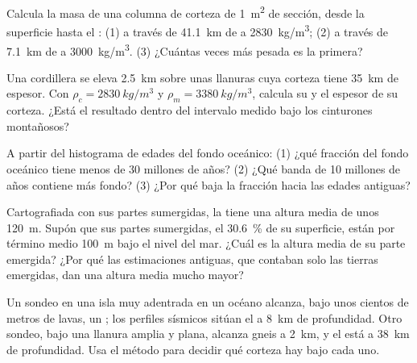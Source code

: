 \begin{exercise}[$\star\star$]\label{exo:g12:continental-crust:7}
Calcula la masa de una columna de corteza de \qty{1}{m^2} de sección, desde
la superficie hasta el : (1) a través de \qty{41.1}{km} de  a \qty{2830}{kg/m^3}; (2) a través de \qty{7.1}{km} de  a \qty{3000}{kg/m^3}. (3) ¿Cuántas veces más pesada es la primera?
\end{exercise}

\begin{exercise}[$\star\star$]\label{exo:g12:continental-crust:8}
Una cordillera se eleva \qty{2.5}{km} sobre unas llanuras cuya corteza tiene
\qty{35}{km} de espesor. Con $\rho_c = \qty{2830}{kg/m^3}$ y $\rho_m =
\qty{3380}{kg/m^3}$, calcula su  y el espesor de su corteza. ¿Está el
resultado dentro del intervalo medido bajo los cinturones montañosos?
\end{exercise}

\begin{exercise}[$\star\star$]\label{exo:g12:continental-crust:9}
A partir del histograma de edades del fondo oceánico: (1) ¿qué fracción del
fondo oceánico tiene menos de 30 millones de años? (2) ¿Qué banda de 10
millones de años contiene más fondo? (3) ¿Por qué baja la fracción hacia las
edades antiguas?
\end{exercise}

\begin{exercise}[$\star\star$]\label{exo:g12:continental-crust:10}
Cartografiada con sus partes sumergidas, la  tiene una
altura media de unos \qty{120}{m}. Supón que sus partes sumergidas, el
\qty{30.6}{\percent} de su superficie, están por término medio \qty{100}{m}
bajo el nivel del mar. ¿Cuál es la altura media de su parte emergida? ¿Por qué
las estimaciones antiguas, que contaban solo las tierras emergidas, dan una
altura media mucho mayor?
\end{exercise}

\begin{exercise}[$\star\star$]\label{exo:g12:continental-crust:11}
Un sondeo en una isla muy adentrada en un océano alcanza, bajo unos cientos de
metros de lavas, un ; los perfiles sísmicos sitúan el  a \qty{8}{km}
de profundidad. Otro sondeo, bajo una llanura amplia y plana, alcanza gneis a
\qty{2}{km}, y el  está a \qty{38}{km} de profundidad. Usa el método para
decidir qué corteza hay bajo cada uno.
\end{exercise}

